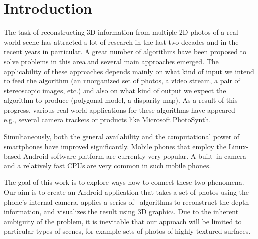 \chapter*{Introduction}

The task of reconstructing 3D information from multiple 2D photos of a real-world scene has attracted a lot of research in the last two decades and in the recent years in particular.
A great number of algorithms have been proposed to solve problems in this area and several main approaches emerged. 
The applicability of these approaches depends mainly on what kind of input we intend to feed the algorithm 
(an unorganized set of photos, a video stream, a pair of stereoscopic images, etc.) 
and also on what kind of output we expect the algorithm to produce (polygonal model, a disparity map). 
As a result of this progress, various real-world applications for these algorithms have appeared -- 
e.g., several camera trackers or products like Microsoft PhotoSynth. %

Simultaneously, both the general availability and the computational power of smartphones have improved significantly.
Mobile phones that employ the Linux-based Android software platform are currently very popular. 
A built–in camera and a relatively fast CPUs are very common in such mobile phones.

The goal of this work is to explore ways how to connect these two phenomena. 
Our aim is to create an Android application that takes a set of photos using the phone's internal camera, applies a series of \cv\ algorithms to reconstruct the depth information, and visualizes the result using 3D graphics. 
Due to the inherent ambiguity of the problem, it is inevitable that our approach will be limited to particular types of scenes, for example sets of photos of highly textured surfaces. 

